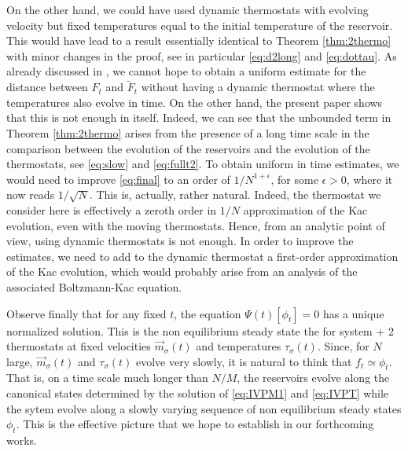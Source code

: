 \documentclass{article}
\begin{document}
On the other hand, we could have used dynamic thermostats with evolving velocity but fixed temperatures equal to the
initial temperature of the reservoir. This would have lead to a result essentially identical to Theorem
\ref{thm:2thermo} with minor changes in the proof, see in particular \eqref{eq:d2long} and \eqref{eq:dottau}. As already
discussed in \cite{BLP25}, we cannot hope to obtain a uniform estimate for the distance between $F_t$ and $\widetilde
F_t$ without having a dynamic thermostat where the temperatures also evolve in time. On the other hand, the present
paper shows that this is not enough in itself. Indeed, we can see that the unbounded term in Theorem
\ref{thm:2thermo} arises from the presence of a long time scale in the comparison between the evolution of the
reservoirs and the evolution of the thermostats, see \eqref{eq:slow} and \eqref{eq:fullt2}. To obtain uniform in time
estimates, we would need to improve \eqref{eq:final} to an order of $1/N^{1 + \epsilon}$, for some $\epsilon>0$, where
it now reads $1/\sqrt{N}$. %
This is, actually, rather natural. Indeed, the thermostat we consider here is effectively a zeroth order in $1/N$
approximation of the Kac evolution, even with the moving thermostats. Hence, from an analytic point of view, using
dynamic thermostats is not enough. In order to improve the estimates, we need to add to the dynamic thermostat a
first-order approximation of the Kac evolution, which would probably arise from an analysis of the associated
Boltzmann-Kac equation.

Observe finally that for any fixed $t$, the equation $\Psi(t)[\phi_t]=0$ has a unique normalized solution. This is the
non equilibrium steady state the for system + 2 thermostats at fixed velocities $\vec m_\sigma(t)$ and temperatures
$\tau_\sigma(t)$. Since, for $N$ large, $\vec m_\sigma(t)$ and $\tau_\sigma(t)$ evolve very slowly, it is natural to
think that $f_t\simeq \phi_t$. That is, on a time scale much longer than $N/M$, the reservoirs evolve along the
canonical states determined by the solution of \eqref{eq:IVPM1} and \eqref{eq:IVPT} while the sytem evolve along a
slowly varying sequence of non equilibrium steady states $\phi_t$. This is the effective picture that we hope to
establish in our forthcoming works.

\medskip
\end{document}
